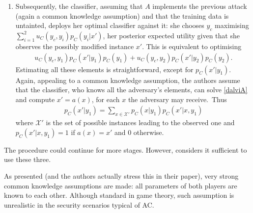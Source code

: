 \begin{enumerate}
\item Subsequently, the classifier, assuming that $A$ implements the previous attack (again a common knowledge assumption) and that the training data is untainted, deploys her optimal classifier against it:
she chooses $y_c$ maximising $\sum_{i=1}^2 u_C(y_c, y_i) p_C(y_i |x')$, her posterior expected utility given that she observes the possibly modified instance $x'$. This is equivalent to optimising 
%
\begin{eqnarray}\label{dalviCK}
u_C (y_c, y_1) p_C(x' |y_1) p_C(y_1) + u_C (y_c, y_2) p_C(x' |y_2) p_C(y_2).
\end{eqnarray}
%
Estimating all these elements is straightforward, except for $p_C(x' \vert y_1)$. Again, appealing to a common knowledge assumption, the authors assume that the classifier, who knows all the adversary's elements, can solve 
\eqref{dalviA} and compute $x' = a(x)$, for each $x$ the adversary may receive.~Thus
%
\begin{eqnarray*} 
p_C(x' |y_1) = \sum_{x \in \mathcal{X}'} p_C (x \vert y_1) p_C (x' \vert x, y_1)
\end{eqnarray*}
where $\mathcal{X}'$ is the set of possible instances leading to the observed one and $p_C(x' \vert x, y_1) = 1$ if $a(x) = x'$ and 0 otherwise.
%
%
\end{enumerate}
%

The procedure could continue for more stages.
However, \cite{adversarialClassification2004} considers it sufficient to use these three.


As presented (and the authors actually stress this
in their paper), very strong common knowledge assumptions are made: all parameters of both players are known to each other. Although standard in game theory, such  assumption is unrealistic in the security scenarios  
typical of AC.



